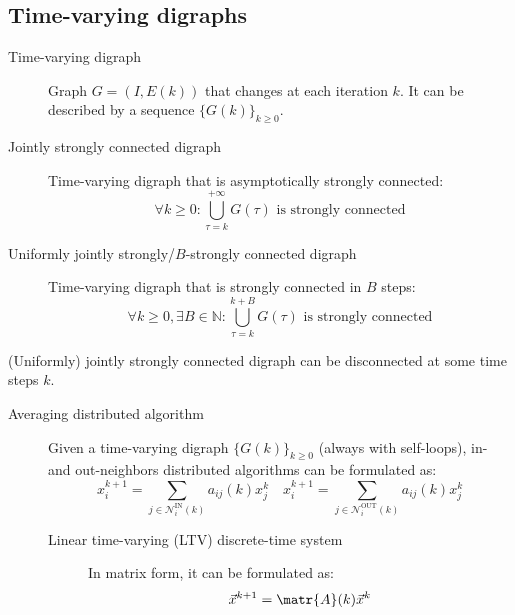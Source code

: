 \subsection{Time-varying digraphs}

\begin{description}
    \item[Time-varying digraph] 
        Graph $G=(I, E(k))$ that changes at each iteration $k$. It can be described by a sequence $\{ G(k) \}_{k \geq 0}$.

    \item[Jointly strongly connected digraph] 
        Time-varying digraph that is asymptotically strongly connected:
        \[ \forall k \geq 0: \bigcup_{\tau=k}^{+\infty} G(\tau) \text{ is strongly connected} \]

    \item[Uniformly jointly strongly/$B$-strongly connected digraph]   
        Time-varying digraph that is strongly connected in $B$ steps:
        \[ \forall k \geq 0, \exists B \in \mathbb{N}: \bigcup_{\tau=k}^{k+B} G(\tau) \text{ is strongly connected} \]
\end{description}

\begin{remark}
    (Uniformly) jointly strongly connected digraph can be disconnected at some time steps $k$.
\end{remark}

\begin{description}
    \item[Averaging distributed algorithm] 
        Given a time-varying digraph $\{ G(k) \}_{k \geq 0}$ (always with self-loops), in- and out-neighbors distributed algorithms can be formulated as:
        \[
            x_i^{k+1} = \sum_{j \in \mathcal{N}_i^\text{IN}(k)} a_{ij}(k) x_j^k
            \quad
            x_i^{k+1} = \sum_{j \in \mathcal{N}_i^\text{OUT}(k)} a_{ij}(k) x_j^k
        \]

        \begin{description}
            \item[Linear time-varying (LTV) discrete-time system] 
                In matrix form, it can be formulated as:
                \[ \vec{x}^{k+1} = \matr{A}(k) \vec{x}^k \]
        \end{description}
\end{description}



